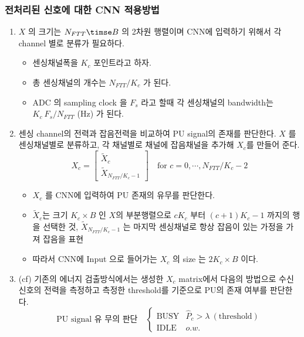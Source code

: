 \subsubsection*{전처리된 신호에 대한 CNN 적용방법}
\begin{enumerate}
    \item $X$ 의 크기는 $N_{FTT} \timse B$ 의 2차원 행렬이며 CNN에 입력하기 위해서 각 channel 별로 분류가 필요하다. 
        \begin{itemize}
            \item 센싱채널폭을 $K_c$ 포인트라고 하자.
            \item 총 센싱채널의 개수는 $N_{FTT} / K_c$ 가 된다. 
            \item ADC 의 sampling clock 을 $F_s$ 라고 할때 각 센싱채널의 bandwidth는 $K_c\ F_s / N_{FTT}$ (Hz) 가 된다.
        \end{itemize}
    \item 센싱 channel의 전력과 잡음전력을 비교하여 PU signal의 존재를 판단한다.  $X$ 를 센싱채널별로 분류하고, 각 채널별로 채널에 잡음채널을 추가해 $X_c$를 만들어 준다. 
        $$
        X_c = 
        \left [
        \begin{matrix}
        \tilde{X}_c \\
        \tilde{X}_{N_{FTT} / K_c -1}
        \end{matrix}
        \right] \quad
        \text{for } c = 0, \cdots, N_{FTT}/K_c -2
        $$
        \begin{itemize}
            \item $X_c$ 를 CNN에 입력하여 PU 존재의 유무를 판단한다. 
            \item $\tilde{X}_c$는 크기 $K_c \times B$ 인 $X$의 부분행렬으로 $c K_c$ 부터 $(c+1) K_c - 1 $ 까지의 행을 선택한 것, $\tilde{X}_{N_{FTT} / K_c -1}$ 는 마지막 센싱채널로 항상 잡음이 있는 가정을 가져 잡음을 표현 
            \item 따라서 CNN에 Input 으로 들어가는 $X_c$ 의 size 는 $2 K_c \times B$  이다. 
        \end{itemize}
    \item (cf) 기존의 에너지 검출방식에서는 생성한 $X_c$ matrix에서 다음의 방법으로  수신신호의 전력을 측정하고 측정한 threshold를 기준으로 PU의 존재 여부를 판단한다. 
        $$
        \text{PU signal 유 무의 판단} \quad
        \begin{cases}
        \text{BUSY} & \hat{P}_c > \lambda\ (\text{threshold})\\
        \text{IDLE} & o.w.
        \end{cases}
$$
\end{enumerate}
